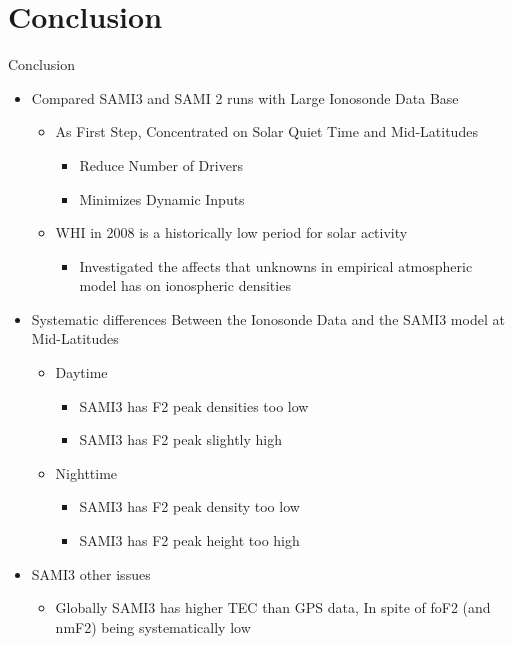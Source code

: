 \documentclass{beamer}
\begin{document}
\section{Conclusion}
\begin{frame}
  {Conclusion}
\Tiny
\begin{itemize}
\Tiny
  \item    Compared SAMI3 and SAMI 2 runs with Large Ionosonde Data Base
    \begin{itemize}
\Tiny
      \item    As First Step, Concentrated on Solar Quiet Time and Mid-Latitudes
	\begin{itemize}
\Tiny
	  \item    Reduce Number of Drivers
	  \item    Minimizes Dynamic Inputs
	\end{itemize}
      \item    WHI in 2008 is a historically low period for solar activity
	\begin{itemize}
\Tiny
	  \item    Investigated the affects that unknowns in empirical atmospheric model has on ionospheric densities
	\end{itemize}
    \end{itemize}
  \item    Systematic differences Between the Ionosonde Data and the SAMI3 model at Mid-Latitudes
    \begin{itemize}
\Tiny
      \item    Daytime
	\begin{itemize}
\Tiny
	  \item    SAMI3 has F2 peak densities too low 
	  \item    SAMI3 has F2 peak slightly high
	\end{itemize}
      \item    Nighttime
	\begin{itemize}
\Tiny
	  \item    SAMI3 has F2 peak density too low
	  \item    SAMI3 has F2 peak height too high
	\end{itemize}
    \end{itemize}
  \item    SAMI3 other issues
    \begin{itemize}
\Tiny
      \item    Globally SAMI3 has higher TEC than GPS data, In spite of foF2 (and nmF2) being systematically low

\end{itemize}
\end{itemize}
\end{frame}
\end{document}

